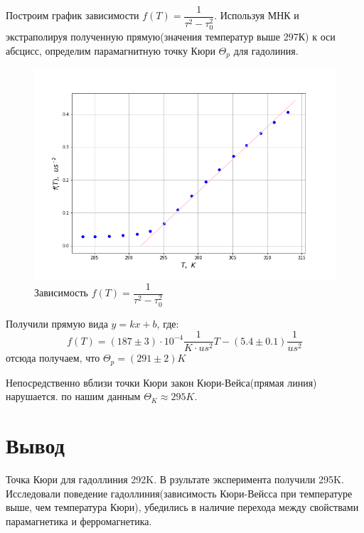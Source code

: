 \documentclass[a4paper]{article}
\begin{document}
Построим график зависимости $f(T) = \dfrac{1}{\tau^2 - \tau_0^2}$. Используя МНК и экстраполируя полученную прямую(значения температур выше 297К) к оси абсцисс, определим парамагнитную точку Кюри $\Theta_p$ для гадолиния.
        \begin{figure}[H]
		\centering
		\includegraphics[width=13cm]{plot1.png}
		\caption{Зависимость $f(T) = \dfrac{1}{\tau^2 - \tau_0^2}$}
	\end{figure}  
Получили прямую вида $y= kx+b$, где:
\begin{equation}\label{}
f(T) = (187 \pm 3) \cdot 10^{-4} \dfrac{1}{K\cdot us^2} T - (5.4 \pm 0.1)\dfrac{1}{us^2}
\end{equation}
отсюда получаем, что $\Theta_p = (291 \pm 2)K$

Непосредственно вблизи точки Кюри закон Кюри-Вейса(прямая линия) нарушается. по нашим данным $\Theta_K \approx 295K$.


    
 

\section{Вывод}
Точка Кюри для гадоллиния 292K. В рзультате эксперимента получили  295K. Исследовали поведение гадоллиния(зависимость Кюри-Вейсса при температуре выше, чем температура Кюри), убедились в наличие перехода между свойствами парамагнетика и ферромагнетика.
      
	
\end{document}
